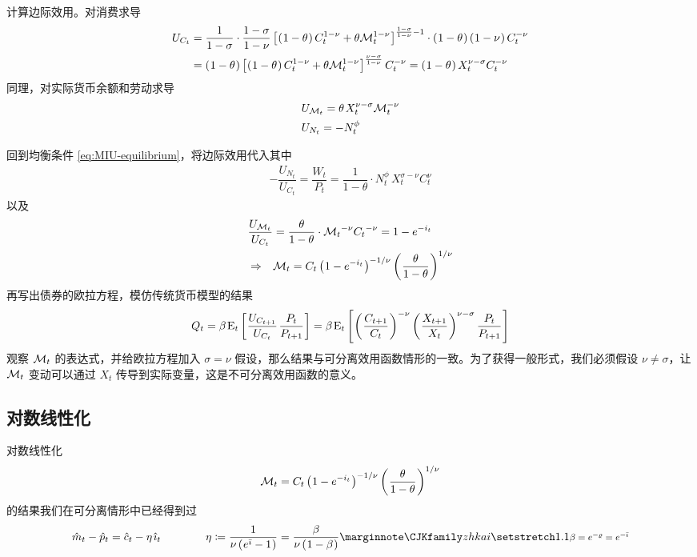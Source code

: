 计算边际效用。对消费求导
\begin{align*}
    U_{C_t}
    &=\dfrac{1}{1-\sigma}\cdot\dfrac{1-\sigma}{1-\nu}
    \bks{\bka{1-\theta}C_t^{1-\nu}+\theta\cal M_t^{1-\nu}}^{\frac{1-\sigma}{1-\nu}-1}
    \cdot\bka{1-\theta}\bka{1-\nu}C_t^{-\nu}\\
    &=\bka{1-\theta}
    \bks{\bka{1-\theta}C_t^{1-\nu}+\theta\cal M_t^{1-\nu}}^{\frac{\nu-\sigma}{1-\nu}}
    C_t^{-\nu}=\bka{1-\theta}X_t^{\nu-\sigma}C_t^{-\nu}
\end{align*}
同理，对实际货币余额和劳动求导
\begin{align*}
    &U_{\cal M_t}=\theta\,X_t^{\nu-\sigma}\cal M_t^{-\nu}\\
    &U_{N_t}=-N_t^\phi
\end{align*}

回到均衡条件 \ref{eq:MIU-equilibrium}，将边际效用代入其中
\begin{align}
    -\dfrac{U_{N_t}}{U_{C_t}}=\dfrac{W_t}{P_t}=\dfrac1{1-\theta}\cdot N_t^\phi\,X_t^{\sigma-\nu}C_t^\nu\label{eq:MIU-labor-equilibrium}
\end{align}
以及
\begin{align*}
    \dfrac{U_{\cal M_t}}{U_{C_t}}&=\dfrac{\theta}{1-\theta}\cdot{\cal M_t}^{-\nu}{C_t}^{-\nu}=1-e^{-i_t}\\
    \Rightarrow\quad & \cal M_t=C_t\bka{1-e^{-i_t}}^{-1/\nu}\bka{\dfrac\theta{1-\theta}}^{1/\nu}
\end{align*}
再写出债券的欧拉方程，模仿传统货币模型的结果
\begin{align*}
    Q_t=\beta\,\meant\bks{\dfrac{U_{C_{t+1}}}{U_{C_t}}\,\dfrac{P_t}{P_{t+1}}}=\beta\,\meant\bks{\bka{\dfrac{C_{t+1}}{C_t}}^{-\nu}\bka{\dfrac{X_{t+1}}{X_t}}^{\nu-\sigma}\dfrac{P_t}{P_{t+1}}}
\end{align*}
观察 \(\cal M_t\) 的表达式，并给欧拉方程加入 \(\sigma=\nu\) 假设，那么结果与可分离效用函数情形的一致。为了获得一般形式，我们必须假设 \(\nu\ne\sigma\)，让 \(\cal M_t\) 变动可以通过 \(X_t\) 传导到实际变量，这是不可分离效用函数的意义。

\subsection{对数线性化}


对数线性化
\begin{align*}
    \cal M_t=C_t\bka{1-e^{-i_t}}^{-1/\nu}\bka{\dfrac\theta{1-\theta}}^{1/\nu}
\end{align*}
的结果我们在可分离情形中已经得到过
\begin{align}
    \hat m_t-\hat p_t=\hat c_t-\eta\,\hat\imath_t\qquad\qquad\eta\coloneq\dfrac{1}{\nu\bka{e^{\bar\imath}-1}}=\dfrac{\beta}{\nu\bka{1-\beta}}\label{eq:MIU-money-equilibrium-log-linear}\sidenote{\sidemath{\(\beta=e^{-\varrho}=e^{-\bar\imath}\)}}
\end{align}

